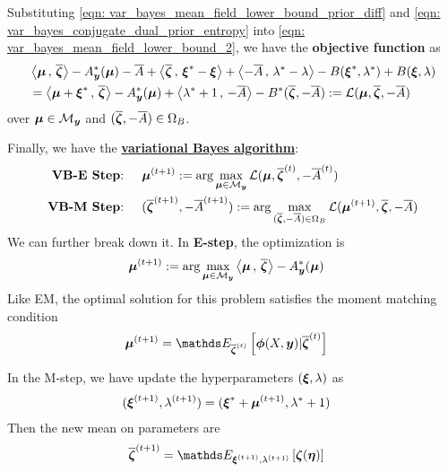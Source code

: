 \documentclass[11pt]{article}
\begin{document}
Substituting \eqref{eqn: var_bayes_mean_field_lower_bound_prior_diff} and \eqref{eqn: var_bayes_conjugate_dual_prior_entropy} into \eqref{eqn: var_bayes_mean_field_lower_bound_2}, we have the \textbf{objective function} as 
\begin{align}
&\left\langle \boldsymbol{\mu} \,,\, \overline{\boldsymbol{\zeta}} \right\rangle- A_{\boldsymbol{y}}^{*}(\boldsymbol{\mu} )  - \overline{A} +  \left\langle \overline{\boldsymbol{\zeta}}\,,\, \boldsymbol{\xi}^{*} - \boldsymbol{\xi} \right\rangle+\left\langle -\overline{A}\,,\,  \lambda^{*}  - \lambda \right\rangle - B( \boldsymbol{\xi}^{*}, \lambda^{*})  + B(\boldsymbol{\xi}, \lambda) \nonumber\\
&= \left\langle \boldsymbol{\mu} + \boldsymbol{\xi}^{*} \,,\, \overline{\boldsymbol{\zeta}} \right\rangle - A_{\boldsymbol{y}}^{*}(\boldsymbol{\mu} ) +\left\langle  \lambda^{*} + 1 \,,\, -\overline{A} \right\rangle - B^{*}(\overline{\boldsymbol{\zeta}}, -\overline{A}) := {\mathcal L}(\boldsymbol{\mu}, \overline{\boldsymbol{\zeta}}, -\overline{A})  \label{eqn: var_bayes_mean_field_lower_bound_3}
\end{align} over $\boldsymbol{\mu} \in  {\mathcal M}_{\boldsymbol{y}}$ and $(\overline{\boldsymbol{\zeta}}, -\overline{A}) \in  \Omega_B$. 

Finally, we have the \underline{\textbf{variational Bayes algorithm}}:
\begin{align}
\text{\textbf{VB-E Step}: }\quad&  \boldsymbol{\mu}^{(t+1)} := \arg\max_{\boldsymbol{\mu}  \in {\mathcal M}_{\boldsymbol{y}}}   {\mathcal L}(\boldsymbol{\mu}, \overline{\boldsymbol{\zeta}}^{(t)}, -\overline{A}^{(t)})  \label{eqn: var_bayes_e_step}\\
\text{\textbf{VB-M Step}: }\quad& (\overline{\boldsymbol{\zeta}}^{(t+1)}, -\overline{A}^{(t+1)}) := \arg\max_{(\overline{\boldsymbol{\zeta}}, -\overline{A}) \in  \Omega_B}  {\mathcal L}(\boldsymbol{\mu}^{(t+1)}, \overline{\boldsymbol{\zeta}}, -\overline{A})  \label{eqn: var_bayes_m_step}
\end{align}
We can further break down it. In \textbf{E-step}, the optimization is 
\begin{align}
\boldsymbol{\mu}^{(t+1)} &:= \arg\max_{\boldsymbol{\mu}  \in {\mathcal M}_{\boldsymbol{y}}} \left\langle \boldsymbol{\mu}\,,\, \overline{\boldsymbol{\zeta}} \right\rangle - A_{\boldsymbol{y}}^{*}(\boldsymbol{\mu} ) \label{eqn: var_bayes_e_step_simp}
\end{align} Like EM, the optimal solution for this problem satisfies the moment matching condition
\begin{align}
\mb{\mu}^{(t+1)} &=  \E{\overline{\mb{\zeta}}^{(t)}}{\mb{\phi}(X, \mb{y})| \overline{\mb{\zeta}}^{(t)}}  \label{eqn: var_bayes_e_step_sol}
\end{align}

In the M-step, we have update the hyperparameters $(\boldsymbol{\xi}, \lambda)$ as
\begin{align}
(\boldsymbol{\xi}^{(t+1)}, \lambda^{(t+1)}) &= (\boldsymbol{\xi}^{*} +\boldsymbol{\mu}^{(t+1)}  , \lambda^{*} + 1)  \label{eqn: var_bayes_m_step_hyper_update_sol}
\end{align} Then the new mean on parameters are
\begin{align}
\overline{\mb{\zeta}}^{(t+1)} &= \E{\mb{\xi}^{(t+1)}, \lambda^{(t+1)}}{\mb{\zeta}(\mb{\eta})} \label{eqn: var_bayes_m_step_param_mean_update_sol}
\end{align}
\end{document}

